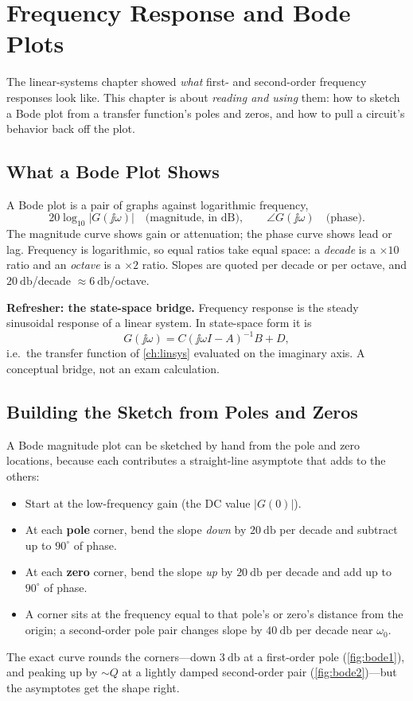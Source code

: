 \chapter{Frequency Response and Bode Plots}
\label{ch:bode}
The linear-systems chapter showed \emph{what} first- and second-order frequency
responses look like. This chapter is about \emph{reading and using} them: how to
sketch a Bode plot from a transfer function's poles and zeros, and how to pull a
circuit's behavior back off the plot.

\section{What a Bode Plot Shows}
A Bode plot is a pair of graphs against logarithmic frequency,
\[
20\log_{10}|G(\jj\omega)|
\quad\text{(magnitude, in dB)},
\qquad
\angle G(\jj\omega)
\quad\text{(phase)}.
\]
The magnitude curve shows gain or attenuation; the phase curve shows lead or lag.
Frequency is logarithmic, so equal ratios take equal space: a \emph{decade} is a
\(\times 10\) ratio and an \emph{octave} is a \(\times 2\) ratio. Slopes are quoted
per decade or per octave, and \(\SI{20}{\decibel}\)/decade
\(\approx\SI{6}{\decibel}\)/octave.

\begin{controlsbox}
\textbf{Refresher: the state-space bridge.} Frequency response is the steady
sinusoidal response of a linear system. In state-space form it is
\[
G(\jj\omega)=C(\jj\omega I-A)^{-1}B+D,
\]
i.e.\ the transfer function of \cref{ch:linsys} evaluated on the imaginary axis.
A conceptual bridge, not an exam calculation.
\end{controlsbox}

\section{Building the Sketch from Poles and Zeros}
A Bode magnitude plot can be sketched by hand from the pole and zero locations,
because each contributes a straight-line asymptote that adds to the others:
\begin{itemize}
\item Start at the low-frequency gain (the DC value \(|G(0)|\)).
\item At each \textbf{pole} corner, bend the slope \emph{down} by
\(\SI{20}{\decibel}\) per decade and subtract up to \(90^\circ\) of phase.
\item At each \textbf{zero} corner, bend the slope \emph{up} by
\(\SI{20}{\decibel}\) per decade and add up to \(90^\circ\) of phase.
\item A corner sits at the frequency equal to that pole's or zero's distance from
the origin; a second-order pole pair changes slope by \(\SI{40}{\decibel}\) per
decade near \(\omega_0\).
\end{itemize}
The exact curve rounds the corners---down \(\SI{3}{\decibel}\) at a first-order
pole (\cref{fig:bode1}), and peaking up by \(\sim Q\) at a lightly damped
second-order pair (\cref{fig:bode2})---but the asymptotes get the shape right.

